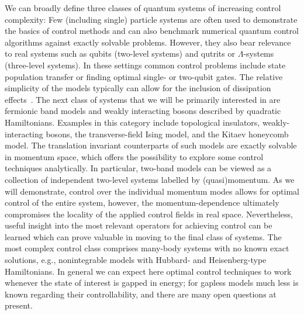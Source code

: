 We can broadly define three classes of quantum systems of increasing control complexity: Few (including single) particle systems are often used to demonstrate the basics of control methods and can also benchmark numerical quantum control algorithms against exactly solvable problems. However, they also bear relevance to real systems such as qubits (two-level systems) and qutrits or $\Lambda$-systems (three-level systems). In these settings common control problems include state population transfer or finding optimal single- or two-qubit gates. The relative simplicity of the models typically can allow for the inclusion of dissipation effects~\cite{Koch2016OpenSys}. The next class of systems that we will be primarily interested in are fermionic band models and weakly interacting bosons described by quadratic Hamiltonians. Examples in this category include topological insulators, weakly-interacting bosons, the transverse-field Ising model, and the Kitaev honeycomb model. The translation invariant counterparts of such models are exactly solvable in momentum space, which offers the possibility to explore some control techniques analytically. In particular, two-band models can be viewed as a collection of independent two-level systems labelled by (quasi)momentum. As we will demonstrate, control over the individual momentum modes allows for optimal control of the entire system, however, the momentum-dependence ultimately compromises the locality of the applied control fields in real space. Nevertheless, useful insight into the most relevant operators for achieving control can be learned which can prove valuable in moving to the final class of systems. The most complex control class comprises many-body systems with no known exact solutions, e.g., nonintegrable models with Hubbard- and Heisenberg-type Hamiltonians. In general we can expect here optimal control techniques to work whenever the state of interest is gapped in energy; for gapless models much less is known regarding their controllability, and there are many open questions at present.

